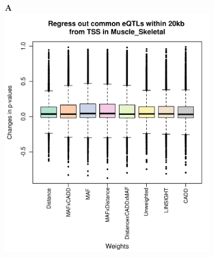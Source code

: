 \documentclass[varwidth=20.5cm,border=4]{standalone}
\begin{document}
\begin{figure}[tb]
    \begin{subfigure}[t]{0.3\linewidth}
        \textbf{A}
        \includegraphics[width=0.9\linewidth,valign=t]{./changes.p.values.Muscle_Skeletal.20kb.pdf}
    \end{subfigure}


\end{figure}
\end{document}
